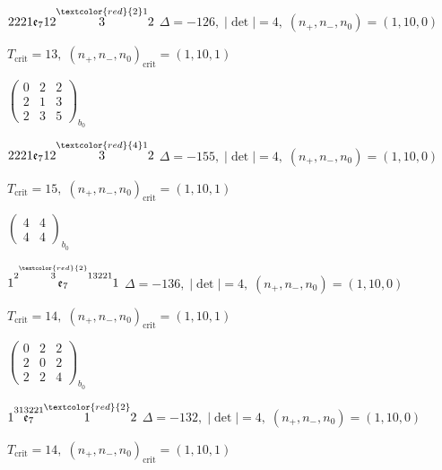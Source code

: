 \documentclass[10pt]{article}
\begin{document}
\smallskip

$2221\mathfrak{e}_712\overset{\textcolor{red}{2}1}{3}2$ \quad $\Delta=-126,\; |\det|=4,\; (n_+,n_-,n_0)=(1,10,0)$

\hspace{1em}$T_{\text{crit}}=13,\; (n_+,n_-,n_0)_{\text{crit}}=(1,10,1)$

\hspace{2em}$\left(\begin{smallmatrix}0 & 2 & 2 \\ 2 & 1 & 3 \\ 2 & 3 & 5\end{smallmatrix}\right)_{\!b_0}$

$2221\mathfrak{e}_712\overset{\textcolor{red}{4}1}{3}2$ \quad $\Delta=-155,\; |\det|=4,\; (n_+,n_-,n_0)=(1,10,0)$

\hspace{1em}$T_{\text{crit}}=15,\; (n_+,n_-,n_0)_{\text{crit}}=(1,10,1)$

\hspace{2em}$\left(\begin{smallmatrix}4 & 4 \\ 4 & 4\end{smallmatrix}\right)_{\!b_0}$

\smallskip

$1\overset{2\overset{\textcolor{red}{2}}{3}13221}{\mathfrak{e}_7}1$ \quad $\Delta=-136,\; |\det|=4,\; (n_+,n_-,n_0)=(1,10,0)$

\hspace{1em}$T_{\text{crit}}=14,\; (n_+,n_-,n_0)_{\text{crit}}=(1,10,1)$

\hspace{2em}$\left(\begin{smallmatrix}0 & 2 & 2 \\ 2 & 0 & 2 \\ 2 & 2 & 4\end{smallmatrix}\right)_{\!b_0}$

\smallskip

$1\overset{313221}{\mathfrak{e}_7}\overset{\textcolor{red}{2}}{1}2$ \quad $\Delta=-132,\; |\det|=4,\; (n_+,n_-,n_0)=(1,10,0)$

\hspace{1em}$T_{\text{crit}}=14,\; (n_+,n_-,n_0)_{\text{crit}}=(1,10,1)$
\end{document}
